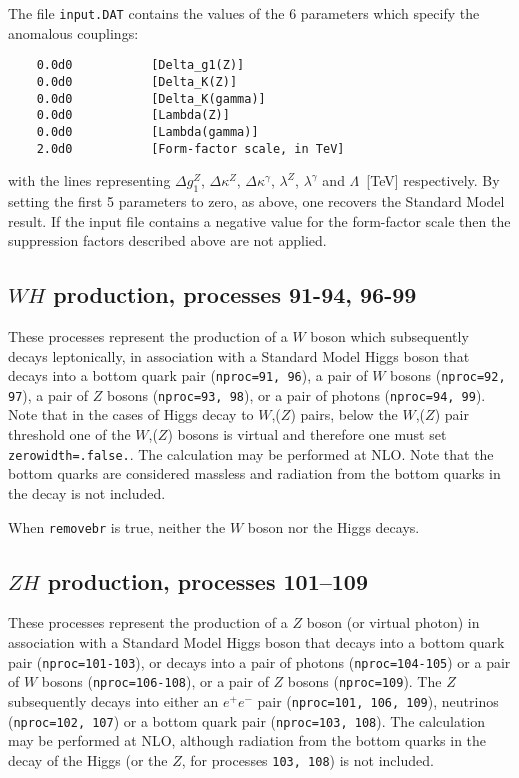 \documentclass[12pt]{article}
\begin{document}
The file {\tt input.DAT} contains the values of the $6$ parameters
which specify the anomalous couplings:
\begin{verbatim}
    0.0d0           [Delta_g1(Z)]
    0.0d0           [Delta_K(Z)]
    0.0d0           [Delta_K(gamma)]
    0.0d0           [Lambda(Z)]
    0.0d0           [Lambda(gamma)]
    2.0d0           [Form-factor scale, in TeV]
\end{verbatim}
with the lines representing $\Delta g_1^Z$, $\Delta \kappa^Z$,
$\Delta \kappa^\gamma$, $\lambda^Z$, $\lambda^\gamma$ and
$\Lambda$~[TeV] respectively. By setting the first 5 parameters to zero,
as above, one recovers the Standard Model result.
If the input file contains a negative value for the form-factor scale
then the suppression factors described above are not applied.

\subsection{$WH$ production, processes 91-94, 96-99}
\label{subsec:wh}

These processes represent the production of a $W$ boson which subsequently
decays leptonically, in association with a Standard Model Higgs boson that
decays into a bottom quark pair ({\tt nproc=91, 96}), 
a pair of $W$ bosons ({\tt nproc=92, 97}), 
a pair of $Z$ bosons ({\tt nproc=93, 98}), or a pair of photons ({\tt nproc=94, 99}).  
Note that in the cases of Higgs decay to $W$,($Z$) pairs, 
below the $W$,($Z$) pair threshold
one of the $W$,($Z$) bosons is virtual 
and therefore one must set {\tt zerowidth=.false.}.
The calculation may be performed at NLO.
Note that the bottom quarks are considered massless and radiation from the
bottom quarks in the decay is not included.

When {\tt removebr} is true, neither the $W$ boson nor the Higgs decays.

\subsection{$ZH$ production, processes 101--109}
\label{subsec:zh}

These processes represent the production of a $Z$ boson (or virtual photon)
in association with a Standard Model Higgs boson that
decays into a bottom quark pair ({\tt nproc=101-103}),
or decays into a pair of photons ({\tt nproc=104-105}) 
or a pair of $W$ bosons ({\tt nproc=106-108}),
or a pair of $Z$ bosons ({\tt nproc=109}). 
The $Z$ subsequently decays into 
either an $e^+ e^-$ pair ({\tt nproc=101, 106, 109}), neutrinos ({\tt nproc=102, 107})
or a bottom quark pair ({\tt nproc=103, 108}).
The calculation may be performed at NLO, although radiation from the
bottom quarks in the decay of the Higgs (or the $Z$, for processes
{\tt 103, 108}) is not included.
\end{document}
